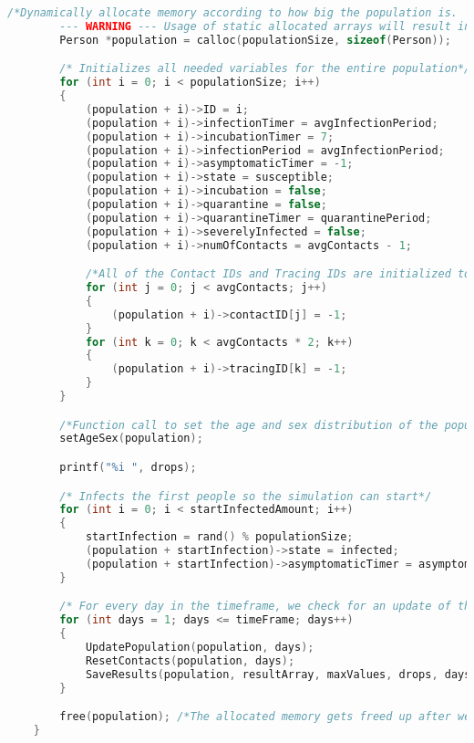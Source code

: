 \begin{lstlisting}[language=c, caption={Our simulations written in c}, captionpos=b, label={snippet:LABELNAVN}]
        /*Dynamically allocate memory according to how big the population is. 
        --- WARNING --- Usage of static allocated arrays will result in not being able to use a population exceeding 12000*/
        Person *population = calloc(populationSize, sizeof(Person));

        /* Initializes all needed variables for the entire population*/
        for (int i = 0; i < populationSize; i++)
        {
            (population + i)->ID = i;
            (population + i)->infectionTimer = avgInfectionPeriod;
            (population + i)->incubationTimer = 7;
            (population + i)->infectionPeriod = avgInfectionPeriod;
            (population + i)->asymptomaticTimer = -1;
            (population + i)->state = susceptible;
            (population + i)->incubation = false;
            (population + i)->quarantine = false;
            (population + i)->quarantineTimer = quarantinePeriod;
            (population + i)->severelyInfected = false;
            (population + i)->numOfContacts = avgContacts - 1;

            /*All of the Contact IDs and Tracing IDs are initialized to -1, to be out of bounds for the population*/
            for (int j = 0; j < avgContacts; j++)
            {
                (population + i)->contactID[j] = -1;
            }
            for (int k = 0; k < avgContacts * 2; k++)
            {
                (population + i)->tracingID[k] = -1;
            }
        }

        /*Function call to set the age and sex distribution of the population*/
        setAgeSex(population);

        printf("%i ", drops);

        /* Infects the first people so the simulation can start*/
        for (int i = 0; i < startInfectedAmount; i++)
        {
            startInfection = rand() % populationSize;
            (population + startInfection)->state = infected;
            (population + startInfection)->asymptomaticTimer = asymptomaticPeriod;
        }

        /* For every day in the timeframe, we check for an update of the state for each person in the population*/
        for (int days = 1; days <= timeFrame; days++)
        {
            UpdatePopulation(population, days);
            ResetContacts(population, days);
            SaveResults(population, resultArray, maxValues, drops, days);
        }

        free(population); /*The allocated memory gets freed up after we're done using it*/
    }


\end{lstlisting}
